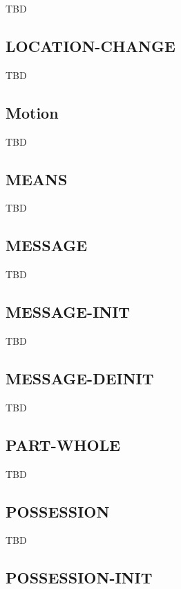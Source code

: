 \documentclass[a4paper]{article}
\newcommand{\fr}[1]{\textsf{#1}}
\begin{document}
TBD

\subsection{\fr{LOCATION-CHANGE}}
\label{sec:LOCATION-CHANGE}

TBD

\subsection{\fr{Motion}}
\label{sec:Motion}

TBD

\subsection{\fr{MEANS}}
\label{sec:MEANS}

TBD

\subsection{\fr{MESSAGE}}
\label{sec:MESSAGE}

TBD

\subsection{\fr{MESSAGE-INIT}}
\label{sec:MESSAGE-INIT}

TBD

\subsection{\fr{MESSAGE-DEINIT}}
\label{sec:MESSAGE-DEINIT}

TBD

\subsection{\fr{PART-WHOLE}}
\label{sec:PART-WHOLE}

TBD

\subsection{\fr{POSSESSION}}
\label{sec:POSSESSION}

TBD

\subsection{\fr{POSSESSION-INIT}}
\label{sec:POSSESSION-INIT}
\end{document}
